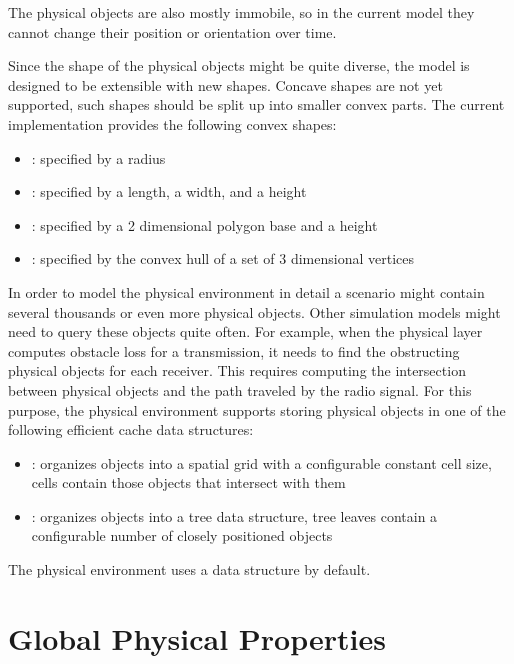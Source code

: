 The physical objects are also mostly immobile, so in the current model they
cannot change their position or orientation over time.

Since the shape of the physical objects might be quite diverse, the model is
designed to be extensible with new shapes. Concave shapes are not yet supported,
such shapes should be split up into smaller convex parts. The current
implementation provides the following convex shapes:

\begin{itemize}
  \item {}: specified by a radius 
  \item {}: specified by a length, a width, and a height
  \item {}: specified by a 2 dimensional polygon base and a height
  \item {}: specified by the convex hull of a set of 3
dimensional vertices 
\end{itemize}

In order to model the physical environment in detail a scenario might contain
several thousands or even more physical objects. Other simulation models might
need to query these objects quite often. For example, when the physical layer
computes obstacle loss for a transmission, it needs to find the obstructing
physical objects for each receiver. This requires computing the intersection
between physical objects and the path traveled by the radio signal. For this
purpose, the physical environment supports storing physical objects in one of
the following efficient cache data structures:

\begin{itemize}
  \item {}: organizes objects into a spatial grid with
a configurable constant cell size, cells contain those objects that intersect
with them
  \item {}: organizes objects into a tree data structure,
tree leaves contain a configurable number of closely positioned objects
\end{itemize}

The physical environment uses a  data structure by
default.

\section{Global Physical Properties}

